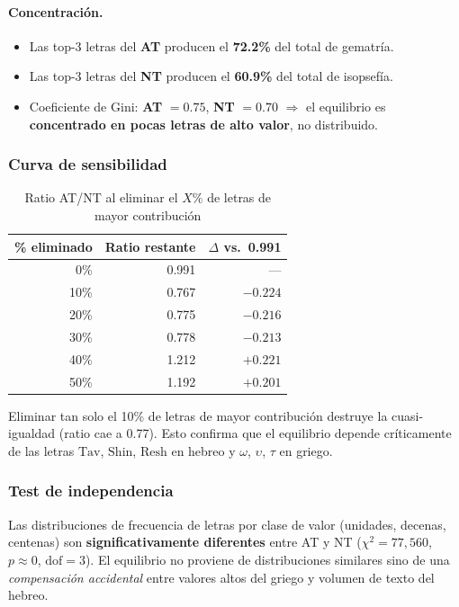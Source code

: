 \documentclass[12pt,a4paper]{article}
\newcommand{\ot}{\textcolor{otcolor}{\textbf{AT}}}
\newcommand{\nt}{\textcolor{ntcolor}{\textbf{NT}}}
\newcommand{\val}[1]{\textcolor{hlcolor}{\textbf{#1}}}
\newcommand{\tav}{\mathrm{Tav}}
\newcommand{\shin}{\mathrm{Shin}}
\newcommand{\resh}{\mathrm{Resh}}
\begin{document}
\paragraph{Concentraci\'on.}
\begin{itemize}[leftmargin=2em]
\item Las top-3 letras del \ot{} producen el \val{72.2\%} del total de gematr\'ia.
\item Las top-3 letras del \nt{} producen el \val{60.9\%} del total de isopsef\'ia.
\item Coeficiente de Gini: \ot{} $= 0.75$, \nt{} $= 0.70$ $\Rightarrow$ el equilibrio
      es \textbf{concentrado en pocas letras de alto valor}, no distribuido.
\end{itemize}

\subsubsection{Curva de sensibilidad}

\begin{table}[H]
\centering
\caption{Ratio AT/NT al eliminar el $X\%$ de letras de mayor contribuci\'on}
\label{tab:sensitivity}
\begin{tabular}{rrr}
\toprule
\textbf{\% eliminado} & \textbf{Ratio restante} & \textbf{$\Delta$ vs.\ 0.991} \\
\midrule
0\%  & 0.991 & --- \\
10\% & 0.767 & $-0.224$ \\
20\% & 0.775 & $-0.216$ \\
30\% & 0.778 & $-0.213$ \\
40\% & 1.212 & $+0.221$ \\
50\% & 1.192 & $+0.201$ \\
\bottomrule
\end{tabular}
\end{table}

Eliminar tan solo el 10\% de letras de mayor contribuci\'on destruye la cuasi-igualdad
(ratio cae a 0.77). Esto confirma que el equilibrio depende cr\'iticamente de las letras
$\tav$, $\shin$, $\resh$ en hebreo y $\omega$, $\upsilon$, $\tau$ en griego.

\subsubsection{Test de independencia}

Las distribuciones de frecuencia de letras por clase de valor (unidades, decenas, centenas)
son \textbf{significativamente diferentes} entre AT y NT
($\chi^2 = 77{,}560$, $p \approx 0$, $\text{dof} = 3$).
El equilibrio no proviene de distribuciones similares sino de una \emph{compensaci\'on accidental}
entre valores altos del griego y volumen de texto del hebreo.
\end{document}
